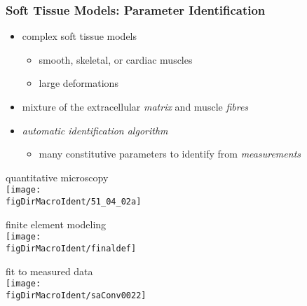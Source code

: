 \begin{frame}
  \frametitle{Soft Tissue Models:  Parameter Identification}
  \begin{itemize}
  \item complex soft tissue models
    \begin{itemize}
    \item smooth, skeletal, or cardiac muscles
    \item large deformations
    \end{itemize}
  \item mixture of the extracellular \emph{matrix} and muscle \emph{fibres}
  \item \emph{automatic identification algorithm}
    \begin{itemize}
    \item many constitutive parameters to identify from \emph{measurements}
    \end{itemize}
  \end{itemize}
  \begin{center}
    \begin{minipage}{0.35\linewidth}
      \scriptsize
      quantitative microscopy \\
      \texttt{[image: \\figDirMacroIdent/51\_04\_02a]}
    \end{minipage}
    \hfill
    \begin{minipage}{0.28\linewidth}
      \scriptsize
      finite element modeling \\
      \texttt{[image: \\figDirMacroIdent/finaldef]}
    \end{minipage}
    \hfill
    \begin{minipage}{0.35\linewidth}
      \scriptsize
      fit to measured data \\
      \texttt{[image: \\figDirMacroIdent/saConv0022]}
    \end{minipage}
  \end{center}
\end{frame}

